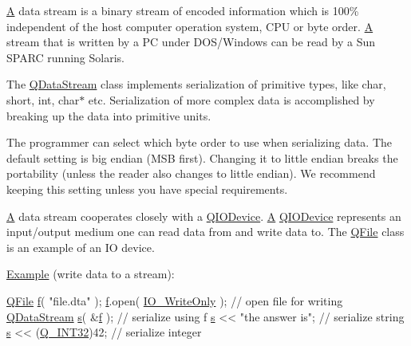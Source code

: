 \hyperlink{class_a}{A} data stream is a binary stream of encoded information which is 100\% independent of the host computer operation system, C\+P\+U or byte order. \hyperlink{class_a}{A} stream that is written by a P\+C under D\+O\+S/\+Windows can be read by a Sun S\+P\+A\+R\+C running Solaris.

The \hyperlink{class_q_data_stream}{Q\+Data\+Stream} class implements serialization of primitive types, like {\ttfamily char}, {\ttfamily short}, {\ttfamily int}, {\ttfamily char$\ast$} etc. Serialization of more complex data is accomplished by breaking up the data into primitive units.

The programmer can select which byte order to use when serializing data. The default setting is big endian (M\+S\+B first). Changing it to little endian breaks the portability (unless the reader also changes to little endian). We recommend keeping this setting unless you have special requirements.

\hyperlink{class_a}{A} data stream cooperates closely with a \hyperlink{class_q_i_o_device}{Q\+I\+O\+Device}. \hyperlink{class_a}{A} \hyperlink{class_q_i_o_device}{Q\+I\+O\+Device} represents an input/output medium one can read data from and write data to. The \hyperlink{class_q_file}{Q\+File} class is an example of an I\+O device.

\hyperlink{struct_example}{Example} (write data to a stream)\+: 
\begin{DoxyCode}
\hyperlink{class_q_file}{QFile} \hyperlink{namespaceversion_adc2f36e5bef89e3881981af504e0e31d}{f}( \textcolor{stringliteral}{"file.dta"} );
\hyperlink{namespaceversion_adc2f36e5bef89e3881981af504e0e31d}{f}.open( \hyperlink{qiodevice_8h_aee87f60968e118b038a637b83ccc4017}{IO\_WriteOnly} );           \textcolor{comment}{// open file for writing}
\hyperlink{class_q_data_stream}{QDataStream} \hyperlink{058__bracket__recursion_8tcl_a011c73f2dbb87635a3b4206c72355f6e}{s}( &\hyperlink{namespaceversion_adc2f36e5bef89e3881981af504e0e31d}{f} );          \textcolor{comment}{// serialize using f}
\hyperlink{058__bracket__recursion_8tcl_a011c73f2dbb87635a3b4206c72355f6e}{s} << \textcolor{stringliteral}{"the answer is"};         \textcolor{comment}{// serialize string}
\hyperlink{058__bracket__recursion_8tcl_a011c73f2dbb87635a3b4206c72355f6e}{s} << (\hyperlink{qglobal_8h_a7adc07f83f3448f63c6b02e33b573b06}{Q\_INT32})42;             \textcolor{comment}{// serialize integer}
\end{DoxyCode}


